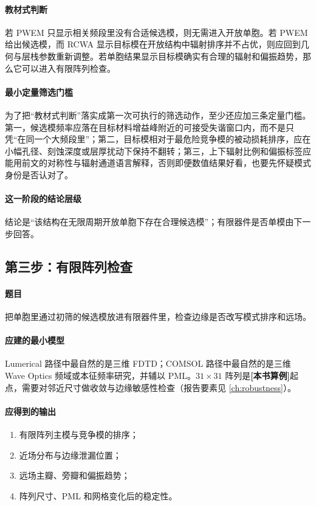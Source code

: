 \paragraph{教材式判断}
若 PWEM 只显示相关频段里没有合适候选模，则无需进入开放单胞。若 PWEM 给出候选模，而 RCWA 显示目标模在开放结构中辐射排序并不占优，则应回到几何与层栈参数重新调整。若单胞结果显示目标模确实有合理的辐射和偏振趋势，那么它可以进入有限阵列检查。

\paragraph{最小定量筛选门槛}
为了把“教材式判断”落实成第一次可执行的筛选动作，至少还应加三条定量门槛。第一，候选模频率应落在目标材料增益峰附近的可接受失谐窗口内，而不是只凭“在同一个大频段里”；第二，目标模相对于最危险竞争模的被动损耗排序，应在小幅孔径、刻蚀深度或层厚扰动下保持不翻转；第三，上下辐射比例和偏振标签应能用前文的对称性与辐射通道语言解释，否则即便数值结果好看，也要先怀疑模式身份是否认对了。

\paragraph{这一阶段的结论层级}
结论是“该结构在无限周期开放单胞下存在合理候选模”；有限器件是否单模由下一步回答。

\subsection{第三步：有限阵列检查}
\paragraph{题目} 把单胞里通过初筛的候选模放进有限器件里，检查边缘是否改写模式排序和远场。

\paragraph{应建的最小模型}
Lumerical 路径中最自然的是三维 FDTD；COMSOL 路径中最自然的是三维 Wave Optics 频域或本征频率研究，并辅以 PML。$31\times31$ 阵列是\textbf{[本书算例]}起点，需要对邻近尺寸做收敛与边缘敏感性检查（报告要素见 \cref{ch:robustness}）。

\paragraph{应得到的输出}
\begin{enumerate}
  \item 有限阵列主模与竞争模的排序；
  \item 近场分布与边缘泄漏位置；
  \item 远场主瓣、旁瓣和偏振趋势；
  \item 阵列尺寸、PML 和网格变化后的稳定性。
\end{enumerate}

